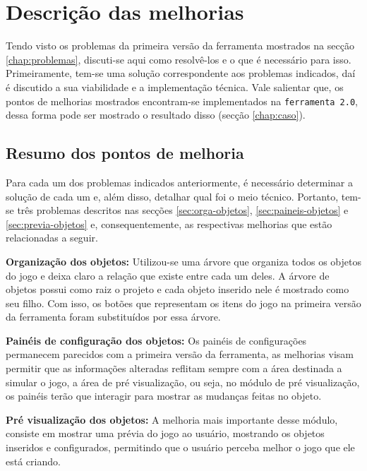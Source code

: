 \documentclass[12pt,twoside,openright,a4paper,english,brazil,sumario=tradicional]{abntex2}
\begin{document}
\chapter{Descrição das melhorias} %
\label{chap:melhorias}
Tendo visto os problemas da primeira versão da ferramenta mostrados na secção \ref{chap:problemas}, discuti-se aqui como resolvê-los e o que é necessário para isso. Primeiramente, tem-se uma solução correspondente aos problemas indicados, daí é discutido a sua viabilidade e a implementação técnica. Vale salientar que, os pontos de melhorias mostrados encontram-se implementados na \texttt{ferramenta 2.0}, dessa forma pode ser mostrado o resultado disso (secção \ref{chap:caso}).

\section{Resumo dos pontos de melhoria}
Para cada um dos problemas indicados anteriormente, é necessário determinar a solução de cada um e, além disso, detalhar qual foi o meio técnico. Portanto, tem-se três problemas descritos nas secções \ref{sec:orga-objetos}, \ref{sec:paineis-objetos} e \ref{sec:previa-objetos} e, consequentemente, as respectivas melhorias que estão relacionadas a seguir.

\begin{alineas}
\item \textbf{Organização dos objetos:} Utilizou-se uma árvore que organiza todos os objetos do jogo e deixa claro a relação que existe entre cada um deles. A árvore de objetos possui como raiz o projeto e cada objeto inserido nele é mostrado como seu filho.  Com isso, os botões que representam os itens do jogo na primeira versão da ferramenta foram substituídos por essa árvore.
\item \textbf{Painéis de configuração dos objetos:} Os painéis de configurações permanecem parecidos com a primeira versão da ferramenta, as melhorias visam permitir que as informações alteradas reflitam sempre com a área destinada a simular o jogo, a área de pré visualização, ou seja, no módulo de pré visualização, os painéis terão que interagir para mostrar as mudanças feitas no objeto.
\item \textbf{Pré visualização dos objetos:} A melhoria mais importante desse módulo, consiste em mostrar uma prévia do jogo ao usuário, mostrando os objetos inseridos e configurados, permitindo que o usuário perceba melhor o jogo que ele está criando.
\end{alineas}
\end{document}
